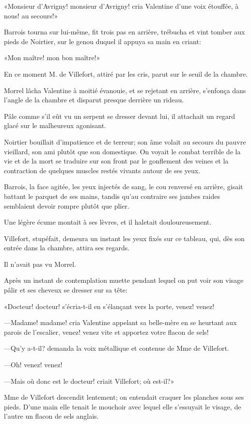 «Monsieur d'Avrigny! monsieur d'Avrigny! cria Valentine d'une voix étouffée, à nous! au secours!» 

Barrois tourna sur lui-même, fit trois pas en arrière, trébucha et vint tomber aux pieds de Noirtier, sur le genou duquel il appuya sa main en criant: 

«Mon maître! mon bon maître!» 

En ce moment M. de Villefort, attiré par les cris, parut sur le seuil de la chambre. 

Morrel lâcha Valentine à moitié évanouie, et se rejetant en arrière, s'enfonça dans l'angle de la chambre et disparut presque derrière un rideau. 

Pâle comme s'il eût vu un serpent se dresser devant lui, il attachait un regard glacé sur le malheureux agonisant. 

Noirtier bouillait d'impatience et de terreur; son âme volait au secours du pauvre vieillard, son ami plutôt que son domestique. On voyait le combat terrible de la vie et de la mort se traduire sur son front par le gonflement des veines et la contraction de quelques muscles restés vivants autour de ses yeux. 

Barrois, la face agitée, les yeux injectés de sang, le cou renversé en arrière, gisait battant le parquet de ses mains, tandis qu'au contraire ses jambes raides semblaient devoir rompre plutôt que plier. 

Une légère écume montait à ses lèvres, et il haletait douloureusement. 

Villefort, stupéfait, demeura un instant les yeux fixés sur ce tableau, qui, dès son entrée dans la chambre, attira ses regards. 

Il n'avait pas vu Morrel. 

Après un instant de contemplation muette pendant lequel on put voir son visage pâlir et ses cheveux se dresser sur sa tête: 

«Docteur! docteur! s'écria-t-il en s'élançant vers la porte, venez! venez! 

—Madame! madame! cria Valentine appelant sa belle-mère en se heurtant aux parois de l'escalier, venez! venez vite et apportez votre flacon de sels! 

—Qu'y a-t-il? demanda la voix métallique et contenue de Mme de Villefort. 

—Oh! venez! venez! 

—Mais où donc est le docteur! criait Villefort; où est-il?» 

Mme de Villefort descendit lentement; on entendait craquer les planches sous ses pieds. D'une main elle tenait le mouchoir avec lequel elle s'essuyait le visage, de l'autre un flacon de sels anglais.  

